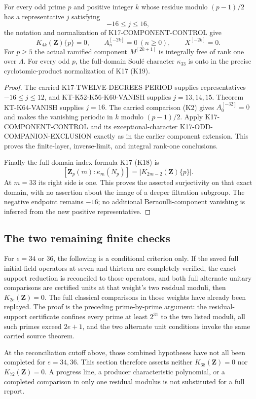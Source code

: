 \begin{corollary}
For every odd prime $p$ and positive integer $k$ whose residue
modulo $(p-1)/2$ has a representative $j$ satisfying
\[
                              -16\leq j\leq16,
\]
the notation and normalization of K17-COMPONENT-CONTROL give
\[
 K_{4k}(\mathbf Z)\{p\}=0,\qquad
 A_n^{[-2k]}=0\ (n\geq0),\qquad X^{[-2k]}=0.
\]
For $p\geq5$ the actual ramified component $M^{[2k+1]}$ is
integrally free of rank one over $\Lambda$.  For every odd
$p$, the full-domain Soul\'e character $\kappa_{33}$ is onto
in the precise cyclotomic-product normalization of K17 (K19).
\end{corollary}
\begin{proof}
The carried K17-TWELVE-DEGREES-PERIOD supplies representatives
$-16\leq j\leq12$, and KT-K52-K56-K60-VANISH supplies
$j=13,14,15$.  Theorem KT-K64-VANISH supplies $j=16$.
The carried comparison (K2) gives $A_0^{[-32]}=0$ and makes
the vanishing periodic in $k$ modulo $(p-1)/2$.  Apply
K17-COMPONENT-CONTROL and its exceptional-character
K17-ODD-COMPANION-EXCLUSION exactly as in the earlier
component extension.  This proves the finite-layer,
inverse-limit, and integral rank-one conclusions.

Finally the full-domain index formula K17 (K18) is
\[
 [\mathbf Z_p(m):\kappa_m(N_p)]
                      =|K_{2m-2}(\mathbf Z)\{p\}|.
\]
At $m=33$ its right side is one.  This proves the asserted
surjectivity on that exact domain, with no assertion about
the image of a deeper filtration subgroup.  The negative
endpoint remains $-16$; no additional Bernoulli-component
vanishing is inferred from the new positive representative.
\end{proof}

\subsection{The two remaining finite checks}

For $e=34$ or $36$, the following is a conditional criterion
only.  If the saved full initial-field operators at seven and
thirteen are completely verified, the exact support reduction
is reconciled to those operators, and both full alternate
unitary comparisons are certified units at that weight's
two residual moduli, then $K_{2e}(\mathbf Z)=0$.  The full
classical comparisons in those weights have already been
replayed.  The proof is the preceding prime-by-prime argument:
the residual-support certificate confines every prime at least
$2^{31}$ to the two listed moduli, all such primes exceed
$2e+1$, and the two alternate unit conditions invoke the
same carried source theorem.

At the reconciliation cutoff above, those combined hypotheses
have not all been completed for $e=34,36$.  This section
therefore asserts neither $K_{68}(\mathbf Z)=0$ nor
$K_{72}(\mathbf Z)=0$.  A progress line, a producer
characteristic polynomial, or a completed comparison in only
one residual modulus is not substituted for a full report.
